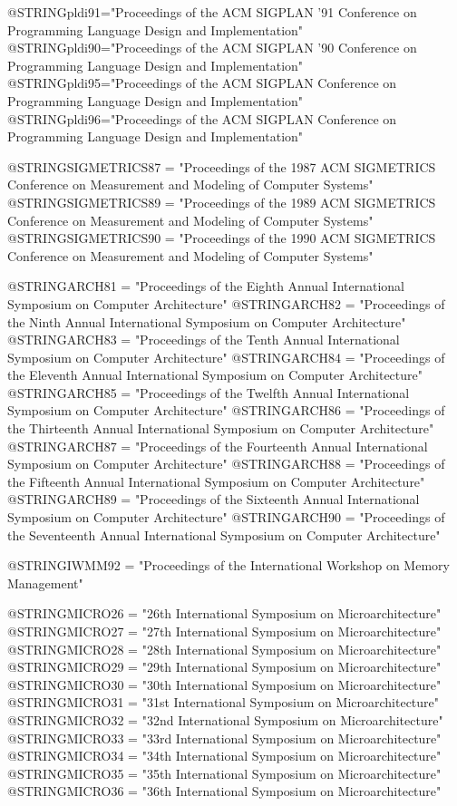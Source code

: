 @STRING{pldi91="Proceedings of the ACM SIGPLAN '91 Conference on Programming Language Design and Implementation"}
@STRING{pldi90="Proceedings of the ACM SIGPLAN '90 Conference on Programming Language Design and Implementation"}
@STRING{pldi95="Proceedings of the ACM SIGPLAN Conference on Programming Language Design and Implementation"}
@STRING{pldi96="Proceedings of the ACM SIGPLAN Conference on Programming Language Design and Implementation"}
	   
	   
@STRING{SIGMETRICS87 = "Proceedings of the 1987 ACM SIGMETRICS Conference on Measurement and Modeling of Computer Systems"}
@STRING{SIGMETRICS89 = "Proceedings of the 1989 ACM SIGMETRICS Conference on Measurement and Modeling of Computer Systems"}
@STRING{SIGMETRICS90 = "Proceedings of the 1990 ACM SIGMETRICS Conference on Measurement and Modeling of Computer Systems"}

@STRING{ARCH81 = "Proceedings of the Eighth Annual International Symposium on Computer Architecture"}
@STRING{ARCH82 = "Proceedings of the Ninth Annual International Symposium on Computer Architecture"}
@STRING{ARCH83 = "Proceedings of the Tenth Annual International Symposium on Computer Architecture"}
@STRING{ARCH84 = "Proceedings of the Eleventh Annual International Symposium on Computer Architecture"}
@STRING{ARCH85 = "Proceedings of the Twelfth Annual International Symposium on Computer Architecture"}
@STRING{ARCH86 = "Proceedings of the Thirteenth Annual International Symposium on Computer Architecture"}
@STRING{ARCH87 = "Proceedings of the Fourteenth Annual International Symposium on Computer Architecture"}
@STRING{ARCH88 = "Proceedings of the Fifteenth Annual International Symposium on Computer Architecture"}
@STRING{ARCH89 = "Proceedings of the Sixteenth Annual International Symposium on Computer Architecture"}
@STRING{ARCH90 = "Proceedings of the Seventeenth Annual International Symposium on Computer Architecture"}
		  
@STRING{IWMM92 = "Proceedings of the International Workshop on Memory Management"}

@STRING{MICRO26 = "26th International Symposium on Microarchitecture"}
@STRING{MICRO27 = "27th International Symposium on Microarchitecture"}
@STRING{MICRO28 = "28th International Symposium on Microarchitecture"}
@STRING{MICRO29 = "29th International Symposium on Microarchitecture"}
@STRING{MICRO30 = "30th International Symposium on Microarchitecture"}
@STRING{MICRO31 = "31st International Symposium on Microarchitecture"}
@STRING{MICRO32 = "32nd International Symposium on Microarchitecture"}
@STRING{MICRO33 = "33rd International Symposium on Microarchitecture"}
@STRING{MICRO34 = "34th International Symposium on Microarchitecture"}
@STRING{MICRO35 = "35th International Symposium on Microarchitecture"}
@STRING{MICRO36 = "36th International Symposium on Microarchitecture"}

